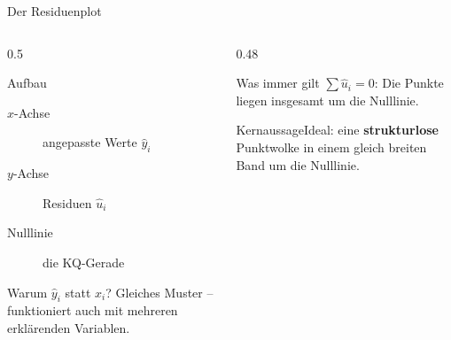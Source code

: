 \documentclass[aspectratio=169,11pt]{beamer}
\newcommand{\kernaussage}[1]{\begin{alertblock}{Kernaussage}#1\end{alertblock}}
\begin{document}
\begin{frame}{Der Residuenplot}
  \begin{columns}[T]
    \begin{column}{0.5\textwidth}
      \begin{block}{Aufbau}
        \begin{description}
          \item[$x$-Achse] angepasste Werte $\hat{y}_i$
          \item[$y$-Achse] Residuen $\hat{u}_i$
          \item[Nulllinie] die KQ-Gerade
        \end{description}
      \end{block}
      \begin{block}{Warum $\hat{y}_i$ statt $x_i$?}
        Gleiches Muster -- funktioniert auch mit mehreren erklärenden Variablen.
      \end{block}
    \end{column}
    \begin{column}{0.48\textwidth}
      \begin{exampleblock}{Was immer gilt}
        $\sum \hat{u}_i = 0$: Die Punkte liegen insgesamt um die Nulllinie.
      \end{exampleblock}
      \kernaussage{Ideal: eine \textbf{strukturlose} Punktwolke in einem gleich
        breiten Band um die Nulllinie.}
    \end{column}
  \end{columns}
\end{frame}
\end{document}
